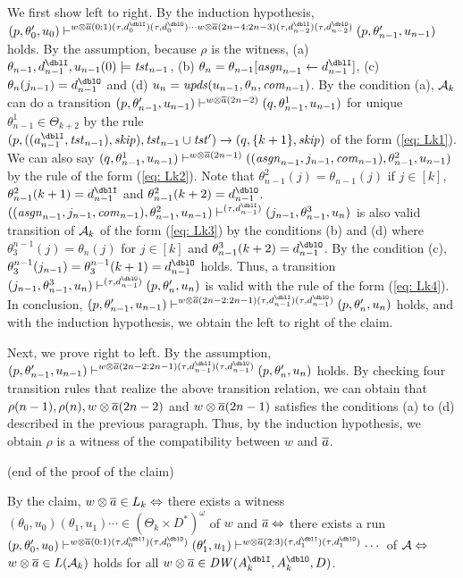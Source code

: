 We first show left to right.
By the induction hypothesis,
$(p,\theta'_0,u_0)\vdash^{w\otimes\overa(0:1)(\tau,d^\dblI_{0})(\tau,d^\dblO_{0})\cdots w\otimes\overa(2n-4:2n-3)(\tau,d^\dblI_{n-2})(\tau,d^\dblO_{n-2})}(p,\theta'_{n-1},u_{n-1})$ holds.
By the assumption, because $\rho$ is the witness,
(a) $\theta_{n-1}, d^\dblI_{n-1}, u_{n-1}(0) \models \tst_{n-1}$,
(b) $\theta_{n}=\theta_{n-1}[\asgn_{n-1}\leftarrow d^\dblI_{n-1}]$,
(c) $\theta_{n}(j_{n-1}) = d^\dblO_{n-1}$ and
(d) $u_{n}=\mathit{upds}(u_{n-1},\theta_n,\mathit{com}_{n-1})$.
By the condition (a),
${\cal A}_k$ can do a transition
$(p,\theta'_{n-1},u_{n-1})\vdash^{w\otimes{\overline{a}}(2n-2)}
(q,\theta^1_{n-1},u_{n-1})$ for unique $\theta^1_{n-1}\in\Theta_{k+2}$ by the rule $(p, ((a^\dblI_{n-1}, \tst_{n-1}), \skip), \tst_{n-1}\cup\tst') \to (q, \{k+1\}, \skip)$ of the form (\ref{eq: Lk1}).
We can also say
$(q,\theta^1_{n-1},u_{n-1})\vdash^{w\otimes{\overline{a}}(2n-1)}
((\mathit{asgn}_{n-1}, j_{n-1}, \mathit{com}_{n-1}),\theta^2_{n-1},u_{n-1})$ by the rule of the form (\ref{eq: Lk2}). Note that $\theta^2_{n-1}(j)=\theta_{n-1}(j)$ if $j\in[k]$, $\theta^2_{n-1}(k+1)=d^\dblI_{n-1}$ and
$\theta^2_{n-1}(k+2)=d^\dblO_{n-1}$.
$((\asgn_{n-1}, j_{n-1}, \com_{n-1}),\theta^2_{n-1},u_{n-1})\vdash^{(\tau,d^\dblI_{n-1})}(j_{n-1},\theta^3_{n-1},u_{n})$ is also valid transition of ${\cal A}_k$ of the form (\ref{eq: Lk3}) by the conditions (b) and (d)
where $\theta_3^{n-1}(j)=\theta_{n}(j)$
for $j\in[k]$ and $\theta^3_{n-1}(k+2)=d^\dblO_{n-1}$.
By the condition (c), $\theta_3^{n-1}(j_{n-1})=\theta_3^{n-1}(k+1)=d^\dblO_{n-1}$ holds.
Thus, a transition $(j_{n-1},\theta^3_{n-1},u_{n})\vdash^{(\tau,d^\dblO_{n-1})}(p,\theta'_{n},u_{n})$ is valid with the rule of the form (\ref{eq: Lk4}).
In conclusion,
$(p,\theta'_{n-1},u_{n-1})\vdash^ {w\otimes\overa(2n-2:2n-1)(\tau,d^\dblI_{n-1})(\tau,d^\dblO_{n-1})}(p,\theta'_{n},u_{n})$
holds, and with the induction hypothesis, we obtain the left to right of the claim.

Next, we prove right to left. By the assumption,
$(p,\theta'_{n-1},u_{n-1})\vdash^ {w\otimes\overa(2n-2:2n-1)(\tau,d^\dblI_{n-1})(\tau,d^\dblO_{n-1})}(p,\theta'_{n},u_{n})$
holds. By checking four transition rules that realize the above transition relation, we can obtain that $\rho(n-1), \rho(n), w\otimes{\overline{a}}(2n-2)$ and $w\otimes{\overline{a}}(2n-1)$ satisfies the conditions (a) to (d) described in the previous paragraph. Thus, by the induction hypothesis,
we obtain $\rho$ is a witness of the compatibility between $w$ and ${\overline{a}}$.
\begin{flushright}
(end of the proof of the claim)
\end{flushright}
By the claim,
$w\otimes{\overline{a}} \in L_k\Leftrightarrow$
there exists a witness $(\theta_0,u_0)(\theta_1, u_1)\cdots\in (\Theta_k\times D^*)^\omega$ of $w$ and ${\overline{a}}\Leftrightarrow$
there exists a run
$(p,\theta'_0,u_0)\vdash^{w\otimes\overa(0:1)(\tau,d^\dblI_{0})(\tau,d^\dblO_{0})}(\theta'_1,u_1)\vdash^{w\otimes\overa(2:3)(\tau,d^\dblI_{1})(\tau,d^\dblO_{1})}\cdots$ of ${\cal A}\Leftrightarrow$
$w\otimes{\overline{a}} \in L({\cal A}_k)$ holds
for all $w\otimes\overa \in \DW(A_k^\dblI, A_k^\dblO, D)$.




